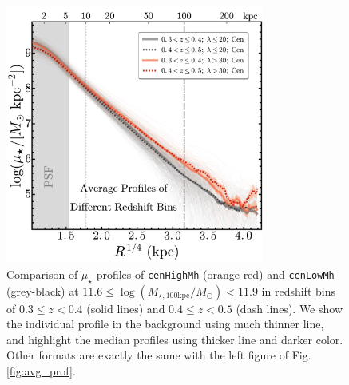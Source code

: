 \documentclass{emulateapj}
\def\rbcg{\texttt{cenHighMh}}
\def\nbcg{\texttt{cenLowMh}}
\def\logmtot{{$\log (M_{\star,100\mathrm{kpc}}/M_{\odot})$}}
\def\mden{{$\mu_{\star}$}}
\begin{document}
\begin{CJK*}{UTF8}{gbsn}
\begin{figure}[htb!]
    \centering 
    \includegraphics[width=8.5cm]{fig/average_mass_profiles_fsps1_B}
    \caption{Comparison of \mden{} profiles of \rbcg{} (orange-red) and \nbcg{} 
        (grey-black) at $11.6 \le$\logmtot$< 11.9$ in redshift bins of 
        $0.3\leq z<0.4$ (solid lines) and $0.4\leq z<0.5$ (dash lines). 
        We show the individual profile in the background using much thinner line, 
        and highlight the median profiles using thicker line and darker color.
        Other formats are exactly the same with the left figure of 
        Fig.\ref{fig:avg_prof}.}
    \label{fig:D1}
\end{figure}    
    

\end{CJK*}
\end{document}
